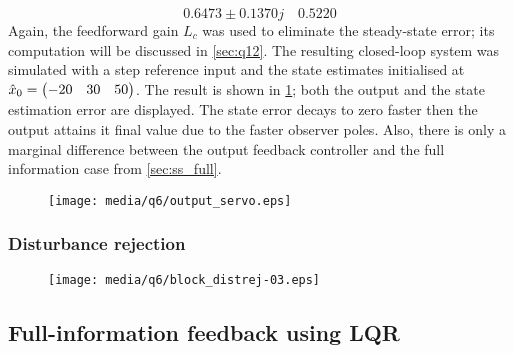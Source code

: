 $$0.6473 \pm 0.1370j \quad  0.5220$$
Again, the feedforward gain $L_c$ was used to eliminate the steady-state error; its computation will be discussed in \cref{sec:q12}. The resulting closed-loop system was simulated with a step reference input and the state estimates initialised at $\hat{x}_0 = \mqty(-20 & 30 & 50)$. The result is shown in \cref{fig:q6_output_servo}; both the output and the state estimation error are displayed. The state error decays to zero faster then the output attains it final value due to the faster observer poles. Also, there is only a marginal difference between the output feedback controller and the full information case from \cref{sec:ss_full}.
\begin{figure}[h!]
    \centering
    \texttt{[image: media/q6/output\_servo.eps]}
    \caption{}
    \label{fig:q6_output_servo}
\end{figure}


\subsubsection{Disturbance rejection}
\begin{figure}[h!]
    \centering
    \texttt{[image: media/q6/block\_distrej-03.eps]}
    \caption{}
    \label{fig:q6_block_distrej}
\end{figure}

\subsection{Full-information feedback using LQR}
\label{sec:ss_lqr}